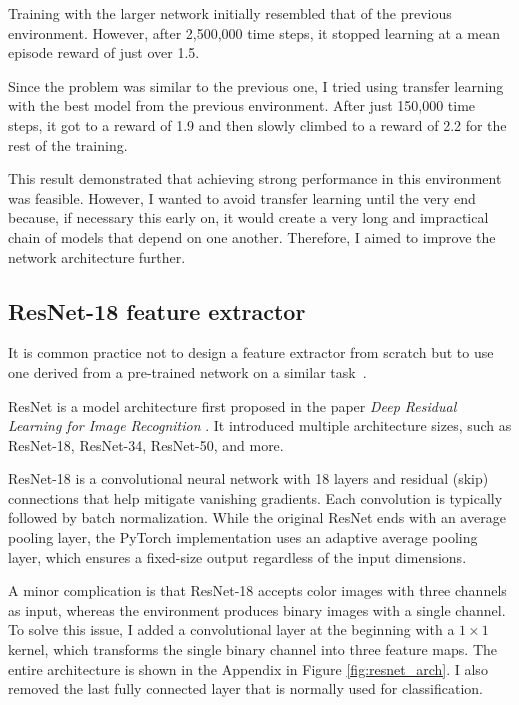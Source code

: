 \documentclass[
  digital,     %
  oneside,     %
  nosansbold,  %
  nocolorbold, %
  lof,         %
  lot,         %
]{fithesis4}
\begin{document}
Training with the larger network initially resembled that of the previous environment. However, after 2,500,000 time steps, it stopped learning at a mean episode reward of just over 1.5.

Since the problem was similar to the previous one, I tried using transfer learning with the best model from the previous environment. After just 150,000 time steps, it got to a reward of 1.9 and then slowly climbed to a reward of 2.2 for the rest of the training.

This result demonstrated that achieving strong performance in this environment was feasible. However, I wanted to avoid transfer learning until the very end because, if necessary this early on, it would create a very long and impractical chain of models that depend on one another. Therefore, I aimed to improve the network architecture further.

\subsection{ResNet-18 feature extractor}
\label{subsec:resnet}

It is common practice not to design a feature extractor from scratch but to use one derived from a pre-trained network on a similar task~\cite{DLforVisualSystems}.

ResNet is a model architecture first proposed in the paper \textit{Deep Residual Learning for Image Recognition} \cite{ResNet18}. It introduced multiple architecture sizes, such as ResNet-18, ResNet-34, ResNet-50, and more.

ResNet-18 is a convolutional neural network with 18 layers and residual (skip) connections that help mitigate vanishing gradients. Each convolution is typically followed by batch normalization. While the original ResNet ends with an average pooling layer, the PyTorch implementation uses an adaptive average pooling layer, which ensures a fixed-size output regardless of the input dimensions.

A minor complication is that ResNet-18 accepts color images with three channels as input, whereas the environment produces binary images with a single channel. To solve this issue, I added a convolutional layer at the beginning with a $1\times1$ kernel, which transforms the single binary channel into three feature maps. The entire architecture is shown in the Appendix in Figure \ref{fig:resnet_arch}. I also removed the last fully connected layer that is normally used for classification.
\end{document}
